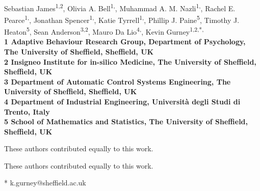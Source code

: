 \documentclass[10pt,letterpaper]{article}
\date{}
\begin{document}
\vspace*{0.35in}

\begin{flushleft}
{\Large
\textbf{}
}
\newline
\\
Sebastian James\textsuperscript{1,2},
Olivia A. Bell\textsuperscript{1,\Yinyang},
Muhammad A. M. Nazli\textsuperscript{1,\Yinyang},
Rachel E. Pearce\textsuperscript{1,\Yinyang},
Jonathan Spencer\textsuperscript{1,\Yinyang},
Katie Tyrrell\textsuperscript{1,\Yinyang},
Phillip J. Paine\textsuperscript{5},
Timothy J. Heaton\textsuperscript{5},
Sean Anderson\textsuperscript{3,2},
Mauro Da Lio\textsuperscript{4,\ddag},
Kevin Gurney\textsuperscript{1,2,*,\ddag}
\\
\bigskip
\bf{1} Adaptive Behaviour Research Group, Department of Psychology, The University of Sheffield, Sheffield, UK
\\
\bf{2} Insigneo Institute for in-silico Medicine, The University of Sheffield, Sheffield, UK
\\
\bf{3} Department of Automatic Control Systems Engineering, The University of Sheffield, Sheffield, UK
\\
\bf{4} Department of Industrial Engineering, Universit\`{a} degli Studi di Trento, Italy
\\
\bf{5} School of Mathematics and Statistics, The University of Sheffield, Sheffield, UK
\\\bigskip

%
%
\Yinyang These authors contributed equally to this work.

\ddag These authors contributed equally to this work.



* k.gurney@sheffield.ac.uk

\end{flushleft}
\end{document}
